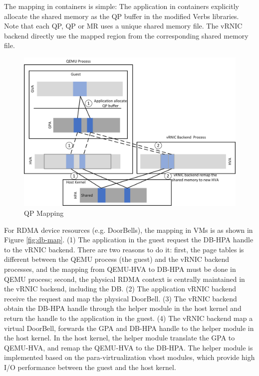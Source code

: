  The mapping in containers is simple: The application in containers explicitly allocate the shared memory as the QP buffer in the modified Verbs libraries. Note that each QP, QP or MR uses a unique shared memory file. The vRNIC backend directly use the mapped region from the corresponding shared memory file.
\begin{figure}[!ht]
	\centering
	\includegraphics[width=1\linewidth]{images/qp-map.png}
	\caption{QP Mapping}
	\label{fig:qp-map}
\end{figure}

 

 For RDMA device resources (e.g. DoorBells), the mapping in VMs is as shown in  Figure \ref{fig:db-map}. (1) The application in the guest request the DB-HPA handle to the vRNIC backend. There are two reasons to do it: first, the page tables is different between the QEMU process (the guest) and the vRNIC backend processes, and the mapping from QEMU-HVA to DB-HPA must be done in QEMU process; second, the physical RDMA context is centrally maintained in the vRNIC backend, including the DB. (2) The application vRNIC backend receive the request and map the physical DoorBell. (3) The vRNIC backend obtain the DB-HPA handle through the helper module in the host kernel and return the handle to the application in the guest. (4) The vRNIC backend map a virtual DoorBell, forwards the GPA and DB-HPA handle to the helper module in the host kernel. In the host kernel, the helper module translate the GPA to QEMU-HVA, and remap the QEMU-HVA to the DB-HPA. The helper module is implemented based on the para-virtrualization vhost modules, which provide high I/O performance  between the guest and the host kernel.
 
